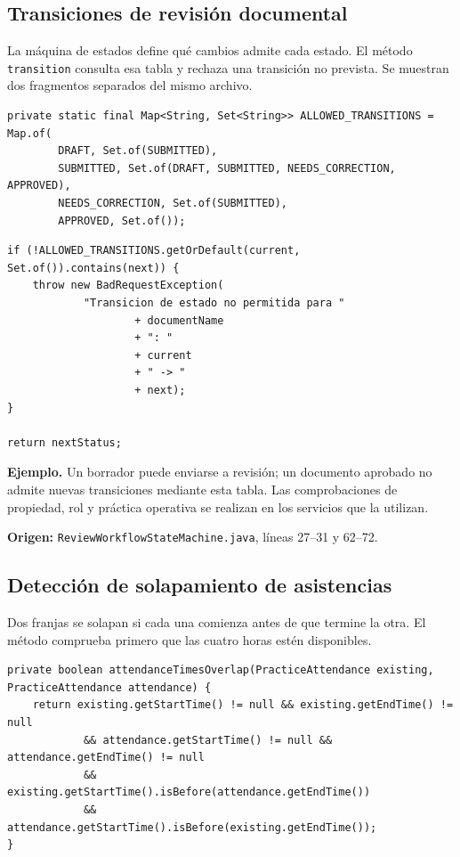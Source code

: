 \documentclass[11pt,a4paper]{article}
\begin{document}
\subsection{Transiciones de revisión documental}
La máquina de estados define qué cambios admite cada estado. El método
\texttt{transition} consulta esa tabla y rechaza una transición no prevista.
Se muestran dos fragmentos separados del mismo archivo.

\begin{lstlisting}[style=sgpjava,firstnumber=27]
private static final Map<String, Set<String>> ALLOWED_TRANSITIONS = Map.of(
        DRAFT, Set.of(SUBMITTED),
        SUBMITTED, Set.of(DRAFT, SUBMITTED, NEEDS_CORRECTION, APPROVED),
        NEEDS_CORRECTION, Set.of(SUBMITTED),
        APPROVED, Set.of());
\end{lstlisting}
\begin{lstlisting}[style=sgpjava,firstnumber=62]
if (!ALLOWED_TRANSITIONS.getOrDefault(current, Set.of()).contains(next)) {
    throw new BadRequestException(
            "Transicion de estado no permitida para "
                    + documentName
                    + ": "
                    + current
                    + " -> "
                    + next);
}

return nextStatus;
\end{lstlisting}

\textbf{Ejemplo.} Un borrador puede enviarse a revisión; un documento aprobado no
admite nuevas transiciones mediante esta tabla. Las comprobaciones de propiedad,
rol y práctica operativa se realizan en los servicios que la utilizan.

{\small\textbf{Origen:} \texttt{ReviewWorkflowStateMachine.java}, líneas 27--31 y 62--72.\par}

\subsection{Detección de solapamiento de asistencias}
Dos franjas se solapan si cada una comienza antes de que termine la otra.
El método comprueba primero que las cuatro horas estén disponibles.

\begin{lstlisting}[style=sgpjava,firstnumber=721]
private boolean attendanceTimesOverlap(PracticeAttendance existing, PracticeAttendance attendance) {
    return existing.getStartTime() != null && existing.getEndTime() != null
            && attendance.getStartTime() != null && attendance.getEndTime() != null
            && existing.getStartTime().isBefore(attendance.getEndTime())
            && attendance.getStartTime().isBefore(existing.getEndTime());
}
\end{lstlisting}
\end{document}
